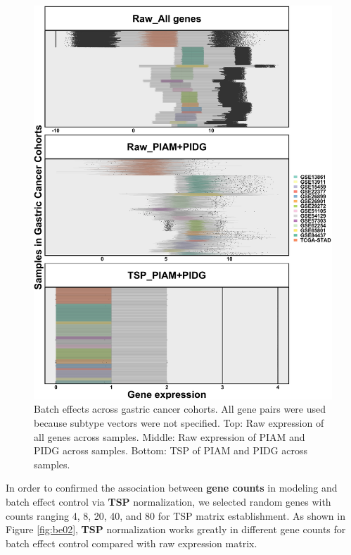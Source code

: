 \documentclass[
  12pt,
]{book}
\begin{document}
\begin{figure}

{\centering \includegraphics[width=0.9\linewidth]{./fig/bactch-effect-01} 

}

\caption{Batch effects across gastric cancer cohorts. All gene pairs were used because subtype vectors were not specified. Top: Raw expression of all genes across samples. Middle: Raw expression of PIAM and PIDG across samples. Bottom: TSP of PIAM and PIDG across samples.}\label{fig:be01}
\end{figure}

In order to confirmed the association between \textbf{gene counts} in modeling and batch effect control via \textbf{TSP} normalization, we selected random genes with counts ranging 4, 8, 20, 40, and 80 for TSP matrix establishment. As shown in Figure \ref{fig:be02}, \textbf{TSP} normalization works greatly in different gene counts for batch effect control compared with raw expression matrix.
\end{document}
